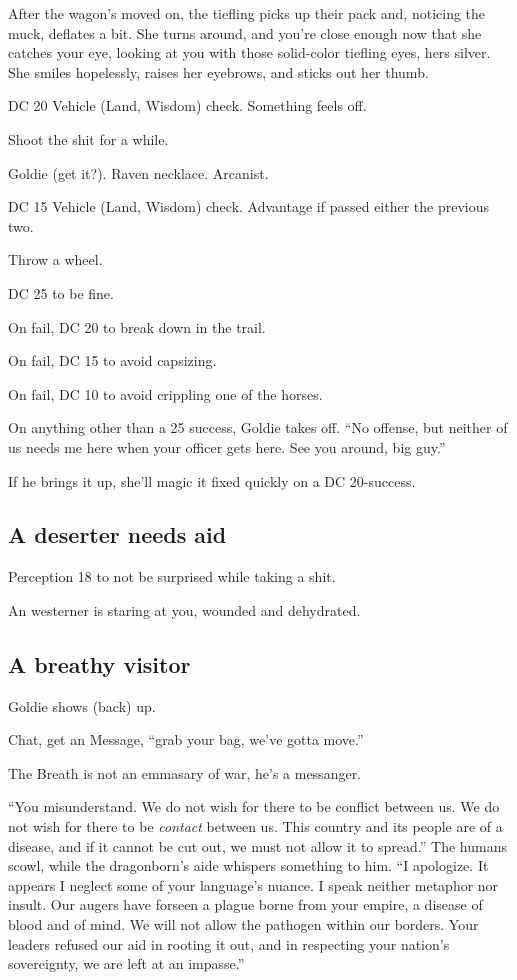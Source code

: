 \begin{multicols}{2}
\begin{aloud}
  After the wagon's moved on, the tiefling picks up their pack and, noticing the muck, deflates
    a bit.
  She turns around, and you're close enough now that she catches your eye, looking at you with
    those solid-color tiefling eyes, hers silver.
  She smiles hopelessly, raises her eyebrows, and sticks out her thumb.
  \end{aloud}

DC 20 Vehicle (Land, Wisdom) check.  Something feels off.

Shoot the shit for a while.

Goldie (get it?).
Raven necklace.
Arcanist.

DC 15 Vehicle (Land, Wisdom) check.  Advantage if passed either the previous two.

Throw a wheel.

DC 25 to be fine.

On fail, DC 20 to break down in the trail.

On fail, DC 15 to avoid capsizing.

On fail, DC 10 to avoid crippling one of the horses.

On anything other than a 25 success, Goldie takes off.
``No offense, but neither of us needs me here when your officer gets here.
See you around, big guy.''

If he brings it up, she'll magic it fixed quickly on a DC 20-success.

\subsection{A deserter needs aid}
Perception 18 to not be surprised while taking a shit.

An westerner is staring at you, wounded and dehydrated.

\subsection{A breathy visitor}
Goldie shows (back) up.

Chat, get an Message, ``grab your bag, we've gotta move.''

The Breath is not an emmasary of war, he's a messanger.

  \begin{aloud}
  ``You misunderstand.
    We do not wish for there to be conflict between us.
    We do not wish for there to be \emph{contact} between us.
    This country and its people are of a disease,
      and if it cannot be cut out, we must not allow it to spread.''
    The humans scowl, while the dragonborn's aide whispers something to him.
  ``I apologize.
    It appears I neglect some of your language's nuance.
    I speak neither metaphor nor insult.
    Our augers have forseen a plague borne from your empire, a disease of blood and of mind.
    We will not allow the pathogen within our borders.
    Your leaders refused our aid in rooting it out, and in respecting your nation's sovereignty,
      we are left at an impasse.''


\end{aloud}
\end{multicols}
